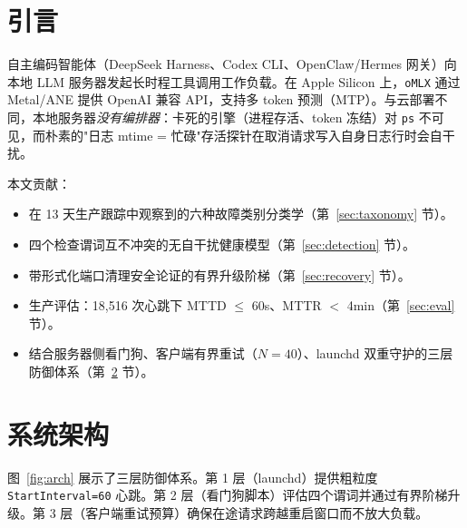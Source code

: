 \documentclass[10pt]{article}
\begin{document}
\tableofcontents
\newpage

\section{引言}\label{sec:intro}

自主编码智能体（DeepSeek Harness、Codex CLI、OpenClaw/Hermes 网关）向本地 LLM 服务器发起长时程工具调用工作负载。在 Apple Silicon 上，\texttt{oMLX} 通过 Metal/ANE 提供 OpenAI 兼容 API，支持多 token 预测（MTP）。与云部署不同，本地服务器\emph{没有编排器}：卡死的引擎（进程存活、token 冻结）对 \texttt{ps} 不可见，而朴素的"日志 mtime = 忙碌"存活探针在取消请求写入自身日志行时会自干扰。

本文贡献：
\begin{itemize}[nosep]
  \item 在 13 天生产跟踪中观察到的六种故障类别分类学（第~\ref{sec:taxonomy} 节）。
  \item 四个检查谓词互不冲突的无自干扰健康模型（第~\ref{sec:detection} 节）。
  \item 带形式化端口清理安全论证的有界升级阶梯（第~\ref{sec:recovery} 节）。
  \item 生产评估：18{,}516 次心跳下 MTTD $\le$ 60s、MTTR $<$ 4min（第~\ref{sec:eval} 节）。
  \item 结合服务器侧看门狗、客户端有界重试（$N{=}40$）、launchd 双重守护的三层防御体系（第~\ref{sec:architecture} 节）。
\end{itemize}

\section{系统架构}\label{sec:architecture}

图~\ref{fig:arch} 展示了三层防御体系。第 1 层（launchd）提供粗粒度 \texttt{StartInterval=60} 心跳。第 2 层（看门狗脚本）评估四个谓词并通过有界阶梯升级。第 3 层（客户端重试预算）确保在途请求跨越重启窗口而不放大负载。
\end{document}

